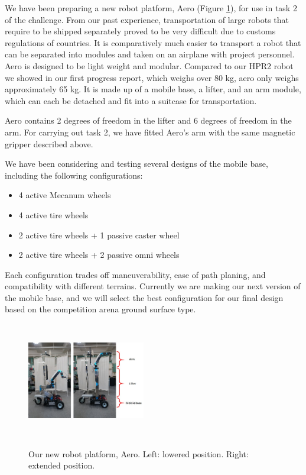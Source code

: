 \documentclass{standalone}
\begin{document}
We have been preparing a new robot platform, Aero (Figure
\ref{fig:aero}), for use in task 2 of the challenge. From our past
experience, transportation of large robots that require to be shipped
separately proved to be very difficult due to customs regulations of
countries. 
It is comparatively much easier to transport a robot that
can be separated into modules and taken on an airplane with project personnel.
Aero is
designed to be light weight and modular. Compared to our HPR2 robot we
showed in our first progress report, which weighs over 80 kg, aero
only weighs approximately 65 kg. It is made up of a mobile base, a
lifter, and an arm module, which can each be detached and fit into a
suitcase for transportation. 

Aero contains 2 degrees of freedom in the lifter and 6 degrees of freedom in the arm. For carrying out task 2, we have fitted Aero's arm with the same
magnetic gripper %
described above. 

We have been considering and testing several designs of the mobile base, including the following configurations:
\begin{itemize}
	\item 4 active Mecanum wheels 
	\item 4 active tire wheels
	\item 2 	active tire wheels + 1 passive caster wheel
	\item 2 	active tire wheels + 2 passive omni wheels
\end{itemize}

Each configuration trades off maneuverability, ease of path planing,
and compatibility with different terrains. Currently we are making our
next version of the mobile base, and we will select the best
configuration for our final design based on the competition arena
ground surface type. 


\begin{figure}[h]
   \newcommand \ilenght{0.1}
   \newcommand \iheight{2.0in}
   \newcommand \iwidth{0.46\textwidth}
   \centering
{\includegraphics[width=\iwidth, height=\iheight]{sections/task2/images/aero.jpg}}\hspace{1.1em}%
   \caption{Our new robot platform, Aero. Left: lowered position. Right: extended position.}
   \label{fig:aero}
 \end{figure}
\end{document}
